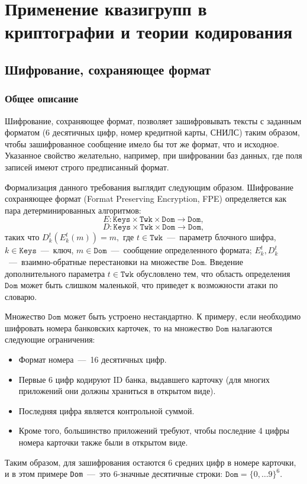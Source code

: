 \chapter{Применение квазигрупп в криптографии и теории кодирования}\label{ch:ch3}

\section{Шифрование, сохраняющее формат}

\subsection{Общее описание}
    
    Шифрование, сохраняющее формат, позволяет зашифровывать тексты с заданным форматом (6 десятичных цифр, номер кредитной карты, СНИЛС) таким образом, чтобы зашифрованное сообщение имело бы тот же формат, что и исходное. 
    Указанное свойство желательно, например, при шифровании баз данных, где поля записей имеют строго предписанный формат.

    Формализация данного требования выглядит следующим образом.
    Шифрование сохраняющее формат (Format Preserving Encryption, FPE) определяется как пара детерминированных алгоритмов:
    \[
        E : \texttt{Keys} \times \texttt{Twk} \times \texttt{Dom} \to \texttt{Dom},
    \]
    \[
        D : \texttt{Keys} \times \texttt{Twk} \times \texttt{Dom} \to \texttt{Dom},
    \]
    таких что $D_k^t(E_k^t(m)) = m,$ 
    где $t \in \texttt{Twk}$~---~параметр блочного шифра, 
    ${k \in \texttt{Keys}}$~---~ключ, 
    $m \in \texttt{Dom}$~---~сообщение определенного формата; 
    $E_k^t, D_k^t$~---~взаимно-обратные перестановки на множестве $\texttt{Dom}.$ 
    Введение дополнительного параметра $t \in \texttt{Twk}$ обусловлено тем, что область определения $\texttt{Dom}$ может быть слишком маленькой, что приведет к возможности атаки по словарю.

    Множество $\texttt{Dom}$ может быть устроено нестандартно. 
    К примеру, если необходимо шифровать номера банковских карточек, то на множество $\texttt{Dom}$ налагаются следующие ограничения:

    \begin{itemize}
        \item Формат номера~---~16 десятичных цифр.
        \item Первые 6 цифр кодируют ID банка, выдавшего карточку (для многих приложений они должны храниться в открытом виде).
        \item Последняя цифра является контрольной суммой. 
        \item Кроме того, большинство приложений требуют, чтобы последние 4 цифры номера карточки также были в открытом виде.
    \end{itemize} 
    Таким образом, для зашифрования остаются 6 средних цифр в номере карточки, и в этом примере \texttt{Dom}~---~это 6-значные десятичные строки: 
    $ \texttt{Dom} = \{0, \ldots 9 \}^6.$ 

